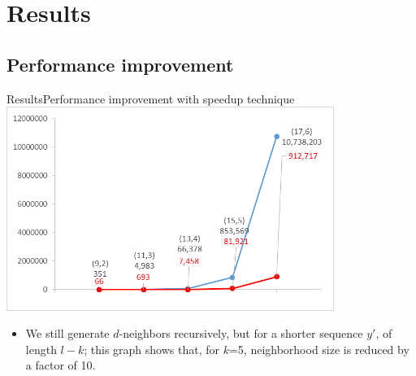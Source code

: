 \documentclass[pdf,xcolor={dvipsnames}]{beamer}
\begin{document}
\section{Results}
	\subsection{Performance improvement}
	\begin{frame}{Results}{Performance improvement with speedup technique}
		{\centering\includegraphics[width=0.8\textwidth]{img/nbrhd_growth_compare.png}\\}
		\begin{itemize}
		\item We still generate $d$-neighbors recursively, but for a shorter sequence $y'$, of length $l-k$;
		this graph shows that, for $k$=5, neighborhood size is reduced by a factor of 10.
		\end{itemize}
		\end{frame}
\end{document}
